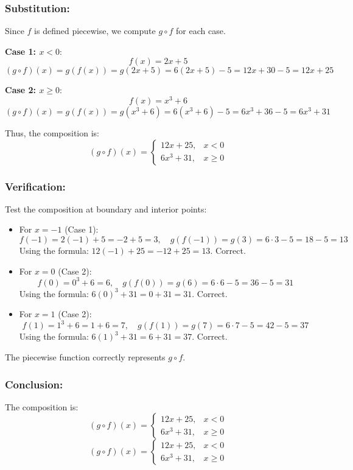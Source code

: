 \documentclass[12pt, a4paper, twoside]{report} %
\begin{document}
\subsubsection*{Substitution:}
Since \( f \) is defined piecewise, we compute \( g \circ f \) for each case.

\textbf{Case 1: \( x < 0 \)}:
\[
f(x) = 2x + 5
\]
\[
(g \circ f)(x) = g(f(x)) = g(2x + 5) = 6(2x + 5) - 5 = 12x + 30 - 5 = 12x + 25
\]

\textbf{Case 2: \( x \geq 0 \)}:
\[
f(x) = x^3 + 6
\]
\[
(g \circ f)(x) = g(f(x)) = g(x^3 + 6) = 6(x^3 + 6) - 5 = 6x^3 + 36 - 5 = 6x^3 + 31
\]

Thus, the composition is:
\[
(g \circ f)(x) = \begin{cases} 
12x + 25, & x < 0 \\
6x^3 + 31, & x \geq 0 
\end{cases}
\]

\subsubsection*{Verification:}
Test the composition at boundary and interior points:
\begin{itemize}
  \item For \( x = -1 \) (Case 1):
    \[
    f(-1) = 2(-1) + 5 = -2 + 5 = 3, \quad g(f(-1)) = g(3) = 6 \cdot 3 - 5 = 18 - 5 = 13
    \]
    Using the formula: \( 12(-1) + 25 = -12 + 25 = 13 \). Correct.
  \item For \( x = 0 \) (Case 2):
    \[
    f(0) = 0^3 + 6 = 6, \quad g(f(0)) = g(6) = 6 \cdot 6 - 5 = 36 - 5 = 31
    \]
    Using the formula: \( 6(0)^3 + 31 = 0 + 31 = 31 \). Correct.
  \item For \( x = 1 \) (Case 2):
    \[
    f(1) = 1^3 + 6 = 1 + 6 = 7, \quad g(f(1)) = g(7) = 6 \cdot 7 - 5 = 42 - 5 = 37
    \]
    Using the formula: \( 6(1)^3 + 31 = 6 + 31 = 37 \). Correct.
\end{itemize}
The piecewise function correctly represents \( g \circ f \).

\subsubsection*{Conclusion:}
The composition is:
\[
(g \circ f)(x) = \begin{cases} 
12x + 25, & x < 0 \\
6x^3 + 31, & x \geq 0 
\end{cases}
\]
\[
\boxed{
(g \circ f)(x) = \begin{cases} 
12x + 25, & x < 0 \\
6x^3 + 31, & x \geq 0 
\end{cases}
}
\]
\end{document}

